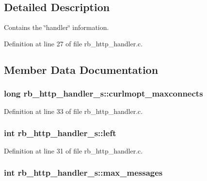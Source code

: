 \subsection{Detailed Description}
Contains the \char`\"{}handler\char`\"{} information. 

Definition at line 27 of file rb\-\_\-http\-\_\-handler.\-c.



\subsection{Member Data Documentation}
\hypertarget{structrb__http__handler__s_a85973abbda4aeb9332a1b59d6aec69a7}{
\subsubsection[{curlmopt\-\_\-maxconnects}]{\setlength{\rightskip}{0pt plus 5cm}long rb\-\_\-http\-\_\-handler\-\_\-s\-::curlmopt\-\_\-maxconnects}}\label{structrb__http__handler__s_a85973abbda4aeb9332a1b59d6aec69a7}


Definition at line 33 of file rb\-\_\-http\-\_\-handler.\-c.

\hypertarget{structrb__http__handler__s_a6239490836609d286669af640028ae71}{
\subsubsection[{left}]{\setlength{\rightskip}{0pt plus 5cm}int rb\-\_\-http\-\_\-handler\-\_\-s\-::left}}\label{structrb__http__handler__s_a6239490836609d286669af640028ae71}


Definition at line 31 of file rb\-\_\-http\-\_\-handler.\-c.

\hypertarget{structrb__http__handler__s_ac8ff888740fc0f4c4365fa08fc7d044f}{
\subsubsection[{max\-\_\-messages}]{\setlength{\rightskip}{0pt plus 5cm}int rb\-\_\-http\-\_\-handler\-\_\-s\-::max\-\_\-messages}}\label{structrb__http__handler__s_ac8ff888740fc0f4c4365fa08fc7d044f}


